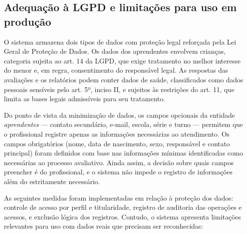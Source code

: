 \subsection{Adequação à LGPD e limitações para uso em produção}

O sistema armazena dois tipos de dados com proteção legal reforçada pela Lei Geral de Proteção de Dados. Os dados dos aprendentes envolvem crianças, categoria sujeita ao art. 14 da LGPD, que exige tratamento no melhor interesse do menor e, em regra, consentimento do responsável legal. As respostas das avaliações e os relatórios podem conter dados de saúde, classificados como dados pessoais sensíveis pelo art. 5º, inciso II, e sujeitos às restrições do art. 11, que limita as bases legais admissíveis para seu tratamento.

Do ponto de vista da minimização de dados, os campos opcionais da entidade \textit{aprendentes} — contato secundário, e-mail, escola, série e turno — permitem que o profissional registre apenas as informações necessárias ao atendimento. Os campos obrigatórios (nome, data de nascimento, sexo, responsável e contato principal) foram definidos com base nas informações mínimas identificadas como necessárias ao processo avaliativo. Ainda assim, a decisão sobre quais campos preencher é do profissional, e o sistema não impede o registro de informações além do estritamente necessário.

As seguintes medidas foram implementadas em relação à proteção dos dados: controle de acesso por perfil e titularidade, registro de auditoria das operações e acessos, e exclusão lógica dos registros. Contudo, o sistema apresenta limitações relevantes para uso com dados reais que precisam ser reconhecidas:

